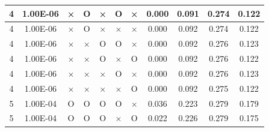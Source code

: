 \documentclass[11pt]{article}
\begin{document}
\begin{longtable}[h]{|r|r|l|l|l|l|l|r|r|l|r|}
\multicolumn{1}{|c|}{4} & \multicolumn{1}{c|}{1.00E-06} & \multicolumn{1}{c|}{×} & \multicolumn{1}{c|}{O} & \multicolumn{1}{c|}{×} & \multicolumn{1}{c|}{O} & \multicolumn{1}{c|}{×} & \multicolumn{1}{c|}{0.000} & \multicolumn{1}{c|}{0.091} & \multicolumn{1}{c|}{0.274} & \multicolumn{1}{c|}{0.122} \\ \hline
\multicolumn{1}{|c|}{4} & \multicolumn{1}{c|}{1.00E-06} & \multicolumn{1}{c|}{×} & \multicolumn{1}{c|}{O} & \multicolumn{1}{c|}{×} & \multicolumn{1}{c|}{×} & \multicolumn{1}{c|}{×} & \multicolumn{1}{c|}{0.000} & \multicolumn{1}{c|}{0.092} & \multicolumn{1}{c|}{0.274} & \multicolumn{1}{c|}{0.122} \\ \hline
\multicolumn{1}{|c|}{4} & \multicolumn{1}{c|}{1.00E-06} & \multicolumn{1}{c|}{×} & \multicolumn{1}{c|}{×} & \multicolumn{1}{c|}{O} & \multicolumn{1}{c|}{O} & \multicolumn{1}{c|}{×} & \multicolumn{1}{c|}{0.000} & \multicolumn{1}{c|}{0.092} & \multicolumn{1}{c|}{0.276} & \multicolumn{1}{c|}{0.123} \\ \hline
\multicolumn{1}{|c|}{4} & \multicolumn{1}{c|}{1.00E-06} & \multicolumn{1}{c|}{×} & \multicolumn{1}{c|}{×} & \multicolumn{1}{c|}{O} & \multicolumn{1}{c|}{×} & \multicolumn{1}{c|}{O} & \multicolumn{1}{c|}{0.000} & \multicolumn{1}{c|}{0.092} & \multicolumn{1}{c|}{0.276} & \multicolumn{1}{c|}{0.122} \\ \hline
\multicolumn{1}{|c|}{4} & \multicolumn{1}{c|}{1.00E-06} & \multicolumn{1}{c|}{×} & \multicolumn{1}{c|}{×} & \multicolumn{1}{c|}{×} & \multicolumn{1}{c|}{O} & \multicolumn{1}{c|}{×} & \multicolumn{1}{c|}{0.000} & \multicolumn{1}{c|}{0.092} & \multicolumn{1}{c|}{0.276} & \multicolumn{1}{c|}{0.123} \\ \hline
\multicolumn{1}{|c|}{4} & \multicolumn{1}{c|}{1.00E-06} & \multicolumn{1}{c|}{×} & \multicolumn{1}{c|}{×} & \multicolumn{1}{c|}{×} & \multicolumn{1}{c|}{×} & \multicolumn{1}{c|}{O} & \multicolumn{1}{c|}{0.000} & \multicolumn{1}{c|}{0.092} & \multicolumn{1}{c|}{0.275} & \multicolumn{1}{c|}{0.122} \\ \hline
\multicolumn{1}{|c|}{5} & \multicolumn{1}{c|}{1.00E-04} & \multicolumn{1}{c|}{O} & \multicolumn{1}{c|}{O} & \multicolumn{1}{c|}{O} & \multicolumn{1}{c|}{O} & \multicolumn{1}{c|}{×} & \multicolumn{1}{c|}{0.036} & \multicolumn{1}{c|}{0.223} & \multicolumn{1}{c|}{0.279} & \multicolumn{1}{c|}{0.179} \\ \hline
\multicolumn{1}{|c|}{5} & \multicolumn{1}{c|}{1.00E-04} & \multicolumn{1}{c|}{O} & \multicolumn{1}{c|}{O} & \multicolumn{1}{c|}{O} & \multicolumn{1}{c|}{×} & \multicolumn{1}{c|}{O} & \multicolumn{1}{c|}{0.022} & \multicolumn{1}{c|}{0.226} & \multicolumn{1}{c|}{0.279} & \multicolumn{1}{c|}{0.175} \\ \hline

\end{longtable}
\end{document}
